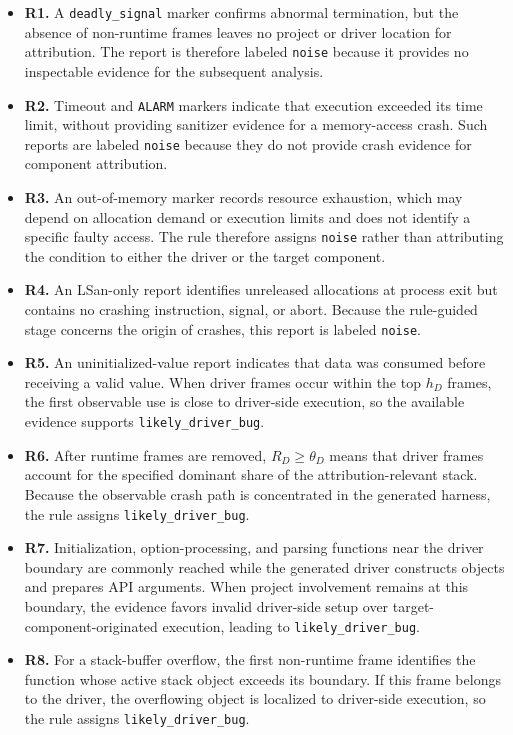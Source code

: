 \documentclass[pdflatex,sn-basic]{sn-jnl}%
\theoremstyle{thmstyleone}%
\theoremstyle{thmstyletwo}%
\theoremstyle{thmstylethree}%
\begin{document}
\begin{itemize}
    \item \textbf{R1.} A \texttt{deadly\_signal} marker confirms abnormal termination, but the absence of non-runtime frames leaves no project or driver location for attribution. The report is therefore labeled \texttt{noise} because it provides no inspectable evidence for the subsequent analysis.
    \item \textbf{R2.} Timeout and \texttt{ALARM} markers indicate that execution exceeded its time limit, without providing sanitizer evidence for a memory-access crash. Such reports are labeled \texttt{noise} because they do not provide crash evidence for component attribution.
    \item \textbf{R3.} An out-of-memory marker records resource exhaustion, which may depend on allocation demand or execution limits and does not identify a specific faulty access. The rule therefore assigns \texttt{noise} rather than attributing the condition to either the driver or the target component.
    \item \textbf{R4.} An LSan-only report identifies unreleased allocations at process exit but contains no crashing instruction, signal, or abort. Because the rule-guided stage concerns the origin of crashes, this report is labeled \texttt{noise}.
    \item \textbf{R5.} An uninitialized-value report indicates that data was consumed before receiving a valid value. When driver frames occur within the top \(h_D\) frames, the first observable use is close to driver-side execution, so the available evidence supports \texttt{likely\_driver\_bug}.
    \item \textbf{R6.} After runtime frames are removed, \(R_D\ge \theta_D\) means that driver frames account for the specified dominant share of the attribution-relevant stack. Because the observable crash path is concentrated in the generated harness, the rule assigns \texttt{likely\_driver\_bug}.
    \item \textbf{R7.} Initialization, option-processing, and parsing functions near the driver boundary are commonly reached while the generated driver constructs objects and prepares API arguments. When project involvement remains at this boundary, the evidence favors invalid driver-side setup over target-component-originated execution, leading to \texttt{likely\_driver\_bug}.
    \item \textbf{R8.} For a stack-buffer overflow, the first non-runtime frame identifies the function whose active stack object exceeds its boundary. If this frame belongs to the driver, the overflowing object is localized to driver-side execution, so the rule assigns \texttt{likely\_driver\_bug}.

\end{itemize}
\end{document}
